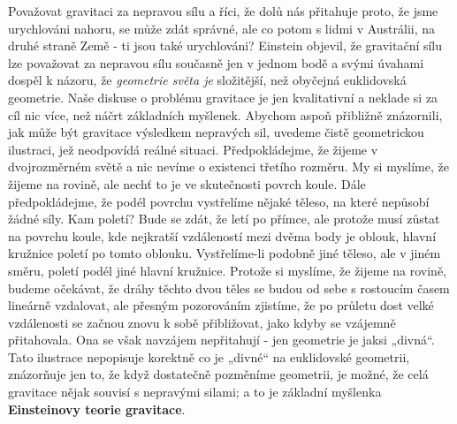 {    Považovat gravitaci za nepravou sílu a říci, že dolů nás přitahuje proto, že jsme urychlováni 
    nahoru, se může zdát správné, ale co potom s lidmi v Austrálii, na druhé straně Země - ti jsou 
    také urychlováni? Einstein objevil, že gravitační sílu lze považovat za nepravou sílu současně 
    jen v jednom bodě a svými úvahami dospěl k názoru, že \emph{geometrie světa je} složitější, 
    než obyčejná euklidovská geometrie. Naše diskuse o problému gravitace je jen kvalitativní a 
    neklade si za cíl nic více, než náčrt základních myšlenek. Abychom aspoň přibližně znázornili, 
    jak může být gravitace výsledkem nepravých sil, uvedeme čistě geometrickou ilustraci, jež 
    neodpovídá reálné situaci. Předpokládejme, že žijeme v dvojrozměrném světě a nic nevíme o 
    existenci třetího rozměru. My si myslíme, že žijeme na rovině, ale nechť to je ve skutečnosti 
    povrch koule. Dále předpokládejme, že podél povrchu vystřelíme nějaké těleso, na které nepůsobí 
    žádné síly. Kam poletí? Bude se zdát, že letí po přímce, ale protože musí zůstat na povrchu 
    koule, kde nejkratší vzdáleností mezi dvěma body je oblouk, hlavní kružnice poletí po tomto 
    oblouku. Vystřelíme-li podobně jiné těleso, ale v jiném směru, poletí podél jiné hlavní 
    kružnice. Protože si myslíme, že žijeme na rovině, budeme očekávat, že dráhy těchto dvou těles 
    se budou od sebe s rostoucím časem lineárně vzdalovat, ale přesným pozorováním zjistíme, že po 
    průletu dost velké vzdálenosti se začnou znovu k sobě přibližovat, jako kdyby se vzájemně 
    přitahovala. Ona se však navzájem nepřitahují - jen geometrie je jaksi „divná“. Tato ilustrace 
    nepopisuje korektně co je „divné“ na euklidovské geometrii, znázorňuje jen to, že když 
    dostatečně pozměníme geometrii, je možné, že celá gravitace nějak souvisí s nepravými silami; a 
    to je základní myšlenka \textbf{Einsteinovy teorie gravitace}.
    
}
